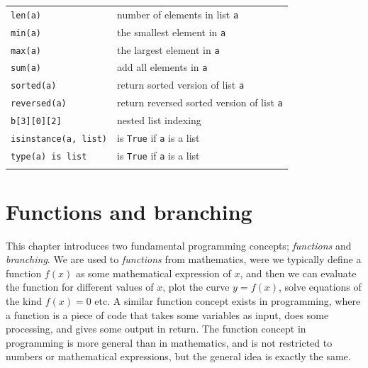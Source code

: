 \documentclass[graybox,envcountchap,sectrefs,final]{svmonodo}
\begin{document}
{{\begin{tabular}{ll}
\texttt{len(a)}                  & number of elements in list \texttt{a}                  \\
\texttt{min(a)}                  & the smallest element in \texttt{a}                     \\
\texttt{max(a)}                  & the largest element in \texttt{a}                      \\
\texttt{sum(a)}                  & add all elements in \texttt{a}                         \\
\texttt{sorted(a)}               & return sorted version of list \texttt{a}               \\
\texttt{reversed(a)}             & return reversed sorted version of list \texttt{a}      \\
\texttt{b[3][0][2]}              & nested list indexing                                 \\
\texttt{isinstance(a, list)}     & is \texttt{True} if \texttt{a} is a list                 \\
\texttt{type(a) is list}         & is \texttt{True} if \texttt{a} is a list                 \\
\noalign{\smallskip}\hline\noalign{\smallskip}
\end{tabular}

\vspace{4mm}

}


\noindent
}

\chapter{Functions and branching}
\label{ch:funcif}

This chapter introduces two fundamental programming concepts; \emph{functions} and \emph{branching}.
We are used to \emph{functions} from mathematics, were we typically define a function $f(x)$ as
some mathematical expression of $x$, and then we can evaluate the function for different
values of $x$, plot the curve $y=f(x)$, solve equations of the kind $f(x)=0$ etc. A similar
function concept exists in programming, where a function is a piece of code that takes some
variables as input, does some processing, and gives some output in return. The function
concept in programming is more general than in mathematics, and is not restricted to
numbers or mathematical expressions, but the general idea is exactly the same.
\end{document}
